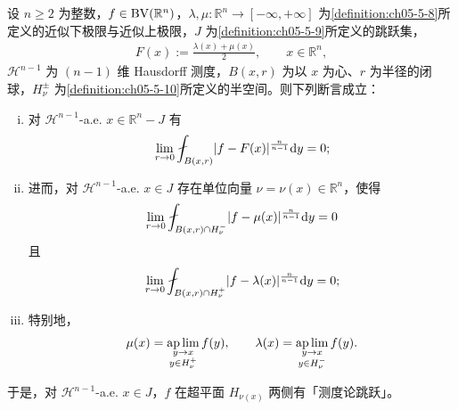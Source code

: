 \documentclass[../../main.tex]{subfiles}%
\begin{document}
\begin{theorem}[$\BV$ 函数的精细性质]\label{theorem:ch05-5-19}
设 $n\geqslant2$ 为整数，$f\in\mathrm{BV}(\mathbb{R}^n)$，$\lambda,\mu:\mathbb{R}^n\to[-\infty,+\infty]$ 为\cref{definition:ch05-5-8}所定义的近似下极限与近似上极限，$J$ 为\cref{definition:ch05-5-9}所定义的跳跃集， %
\begin{align*}
F(x):=\frac{\lambda(x)+\mu(x)}{2},\qquad x\in\mathbb{R}^n ,
\end{align*}
$\mathcal{H}^{n-1}$ 为 $(n-1)$ 维 Hausdorff 测度，$B(x,r)$ 为以 $x$ 为心、$r$ 为半径的闭球，$H_\nu^{\pm}$ 为\cref{definition:ch05-5-10}所定义的半空间。则下列断言成立： %
\begin{enumerate}[(i)]
\item 对 $\mathcal{H}^{n-1}$-a.e. $x\in\mathbb{R}^n-J$ 有
\begin{align*}
\lim_{r\to0}\fint_{B(x,r)}\lvert f-F(x)\rvert^{\frac{n}{n-1}}\diff y=0 ;
\end{align*}
\item 进而，对 $\mathcal{H}^{n-1}$-a.e. $x\in J$ 存在单位向量 $\nu=\nu(x)\in\mathbb{R}^n$，使得
\begin{align*}
\lim_{r\to0}\fint_{B(x,r)\cap H_\nu^-}\lvert f-\mu(x)\rvert^{\frac{n}{n-1}}\diff y=0
\end{align*}
且
\begin{align*}
\lim_{r\to0}\fint_{B(x,r)\cap H_\nu^+}\lvert f-\lambda(x)\rvert^{\frac{n}{n-1}}\diff y=0 ;
\end{align*}
\item 特别地，
\begin{align*}
\mu(x)=\operatorname*{ap\,lim}_{\substack{y\to x\\ y\in H_\nu^+}}f(y),\qquad
\lambda(x)=\operatorname*{ap\,lim}_{\substack{y\to x\\ y\in H_\nu^-}}f(y).
\end{align*}
\end{enumerate}
\end{theorem}

\begin{remark}\label{remark:ch05-thm-5-19-跳跃}
于是，对 $\mathcal{H}^{n-1}$-a.e. $x\in J$，$f$ 在超平面 $H_{\nu(x)}$ 两侧有「测度论跳跃」。
\end{remark}
\end{document}
